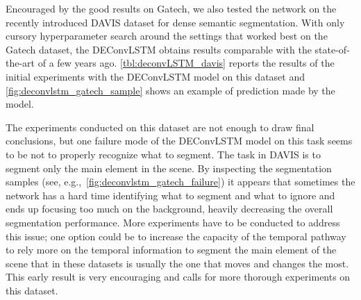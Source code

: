 Encouraged by the good results on Gatech, we also tested the network on the
recently introduced DAVIS dataset for dense semantic segmentation. With only
cursory hyperparameter search around the settings that worked best on the
Gatech dataset, the DEConvLSTM obtains results comparable with the
state-of-the-art of a few years ago. \autoref{tbl:deconvLSTM_davis} reports the
results of the initial experiments with the DEConvLSTM model on this dataset
and \autoref{fig:deconvlstm_gatech_sample} shows an example of prediction made
by the model.

The experiments conducted on this dataset are not enough to draw final
conclusions, but one failure mode of the DEConvLSTM model on this task seems to
be not to properly recognize what to segment. The task in DAVIS is to segment
only the main element in the scene. By inspecting the segmentation samples
(see, e.g.,~\autoref{fig:deconvlstm_gatech_failure}) it appears that sometimes
the network has a hard time identifying what to segment and what to ignore and
ends up focusing too much on the background, heavily decreasing the overall
segmentation performance. More experiments have to be conducted to address this
issue; one option could be to
increase the capacity of the temporal pathway to rely more on the temporal
information to segment the main element of the scene that in these datasets is
usually the one that moves and changes the most. This early result is very
encouraging and calls for more thorough experiments on this dataset.

\begin{table}[t]
    \caption{Results on the Davis dataset. Average Intersection over Union
        (IoU) is reported. We compare to~{\tiny\url{
            https://graphics.ethz.ch/~perazzif/davis/soa_compare.php}},
        where pixel accuracy is not reported.}
    \label{tbl:deconvLSTM_davis}
\end{table}

